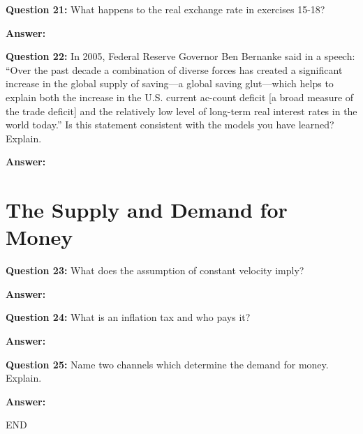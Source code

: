 \documentclass[a4paper, 11pt]{article}
\begin{document}
\textbf{Question 21:} What happens to the real exchange rate in exercises 15-18?

\textbf{Answer:} 


\textbf{Question 22:} In 2005, Federal Reserve Governor Ben Bernanke said in a speech: “Over the past decade a combination of diverse forces has created a significant increase in the global supply of saving—a global saving glut—which helps to explain both the increase in the U.S. current ac-count deficit [a broad measure of the trade deficit] and the relatively low level of long-term real interest rates in the world today.” Is this statement consistent with the models you have learned? Explain.

\textbf{Answer:} 

\section{The Supply and Demand for Money}

\textbf{Question 23:} What does the assumption of constant velocity imply?

\textbf{Answer:} 


\textbf{Question 24:} What is an inflation tax and who pays it?

\textbf{Answer:} 


\textbf{Question 25:} Name two channels which determine the demand for money. Explain.

\textbf{Answer:} 



\centering
END
\end{document}

